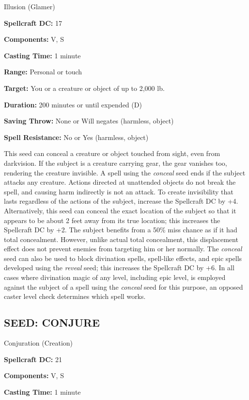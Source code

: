 \documentclass{article}
\begin{document}
Illusion (Glamer) 

\textbf{Spellcraft DC:} 17 

\textbf{Components:} V, S 

\textbf{Casting Time:} 1 minute 

\textbf{Range:} Personal or touch 

\textbf{Target:} You or a creature or object of up to 2,000 lb. 

\textbf{Duration:} 200 minutes or until expended (D) 

\textbf{Saving Throw:} None or Will negates (harmless, object) 

\textbf{Spell Resistance:} No or Yes (harmless, object) 

This seed can conceal a creature or object touched from sight, even from darkvision. 
If the subject is a creature carrying gear, the gear vanishes too, rendering the 
creature invisible. A spell using the \textit{conceal }seed ends if the subject 
attacks any creature. Actions directed at unattended objects do not break the spell, 
and causing harm indirectly is not an attack. To create invisibility that lasts 
regardless of the actions of the subject, increase the Spellcraft DC by +4. Alternatively, 
this seed can conceal the exact location of the subject so that it appears to be 
about 2 feet away from its true location; this increases the Spellcraft DC by +2. 
The subject benefits from a 50\% miss chance as if it had total concealment. However, 
unlike actual total concealment, this displacement effect does not prevent enemies 
from targeting him or her normally. The \textit{conceal }seed can also be used 
to block divination spells, spell-like effects, and epic spells developed using 
the \textit{reveal }seed; this increases the Spellcraft DC by +6. In all cases 
where divination magic of any level, including epic level, is employed against 
the subject of a spell using the \textit{conceal }seed for this purpose, an opposed 
caster level check determines which spell works. 

\vspace{12pt}
\subsection*{SEED: CONJURE }

Conjuration (Creation) 

\textbf{Spellcraft DC:} 21 

\textbf{Components:} V, S 

\textbf{Casting Time:} 1 minute 
\end{document}
